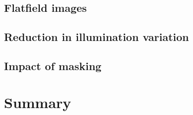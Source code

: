 \documentclass[letterpaper,11pt]{article}
\begin{document}
\subsection{Flatfield images}
\label{ssec:flatfield_images}

\subsection{Reduction in illumination variation}
\label{ssec:reduction_in_illumination_variation}

\subsection{Impact of masking}
\label{ssec:impact_of_masking}

\section{Summary}
\label{sec:summary}


\end{document}
